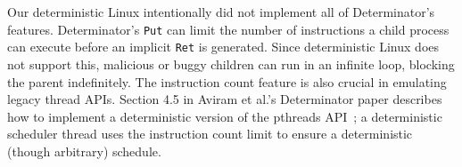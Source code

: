 Our deterministic Linux intentionally did not implement all of Determinator's
features. Determinator's {\tt Put} can limit the number of instructions a child
process can execute before an implicit {\tt Ret} is generated. Since
deterministic Linux does not support this, malicious or buggy children can run
in an infinite loop, blocking the parent indefinitely. The instruction count
feature is also crucial in emulating legacy thread APIs. Section 4.5 in Aviram
et al.'s Determinator paper describes how to implement a deterministic version
of the pthreads API~\cite{Aviram10}; a deterministic scheduler thread uses the
instruction count limit to ensure a deterministic (though arbitrary) schedule.

\endinput

